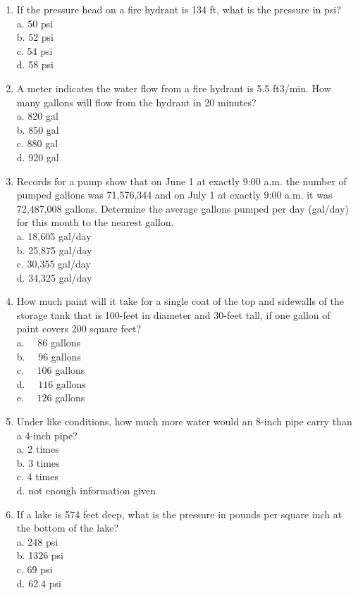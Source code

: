 \documentclass{article}
\begin{document}
\begin{enumerate}
\item If the pressure head on a fire hydrant is 134 ft, what is the pressure in psi?\\
a.	50 psi\\
b.	52 psi\\
c.	54 psi\\
d.	58 psi\\
\item A meter indicates the water flow from a fire hydrant is 5.5 ft3/min. How many gallons will flow from the hydrant in 20 minutes?\\
a.	820 gal\\
b.	850 gal\\
c.	880 gal\\
d.	920 gal\\
\item Records for a pump show that on June 1 at exactly 9:00 a.m. the number of pumped gallons was 71,576,344 and on July 1 at exactly 9:00 a.m. it was 72,487,008 gallons. Determine the average gallons pumped per day (gal/day) for this month to the nearest gallon.\\
a.	18,605 gal/day\\
b.	25,875 gal/day\\
c.	30,355 gal/day\\
d.	34,325 gal/day\\

\item How much paint will it take for a single coat of the top and sidewalls of the storage tank that is 100-feet in diameter and 30-feet tall, if one gallon of paint covers 200 square feet?\\
a. $\quad 86$ gallons\\
b. $\quad 96$ gallons\\
c. $\quad 106$ gallons\\
d. $\quad 116$ gallons\\
e. $\quad 126$ gallons

\item Under like conditions, how much more water would an 8-inch pipe carry than a 4-inch pipe?\\
a.	2 times\\
b.	3 times\\
c.	4 times\\
d.	not enough information given\\

\item If a lake is 574 feet deep, what is the pressure in pounds per square inch at the bottom of the lake?\\
a. 248 psi\\
b. 1326 psi\\
c. 69 psi\\
d. 62.4 psi\\


\end{enumerate}
\end{document}
